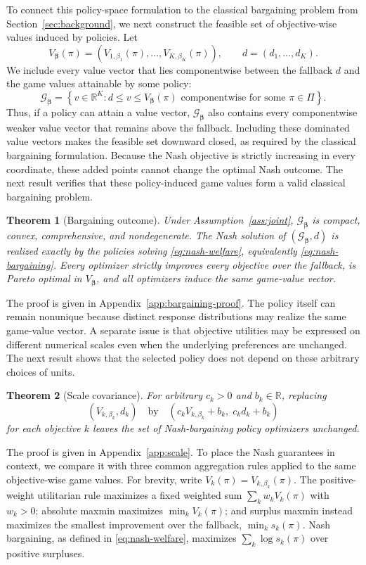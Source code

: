 \documentclass{article}
\newtheorem{theorem}{Theorem}
\theoremstyle{remark}
\theoremstyle{plain}
\newcommand{\G}{\mathcal{G}}
\newcommand{\R}{\mathbb{R}}
\begin{document}
To connect this policy-space formulation to the classical bargaining
problem from Section~\ref{sec:background}, we next construct the feasible
set of objective-wise values induced by policies. Let
\[
V_{\boldsymbol\beta}(\pi)
=
(V_{1,\beta_1}(\pi),\ldots,V_{K,\beta_K}(\pi)),
\qquad
d=(d_1,\ldots,d_K).
\]
We include every value vector that lies componentwise between the
fallback $d$ and the game values attainable by some policy:
\begin{equation}
\G_{\boldsymbol\beta}
=
\left\{
v\in\R^K:
d\le v\le V_{\boldsymbol\beta}(\pi)
\text{ componentwise for some }\pi\in\Pi
\right\}.
\label{eq:comprehensive-hull}
\end{equation}
Thus, if a policy can attain a value vector, $\G_{\boldsymbol\beta}$ also contains every componentwise weaker value vector that remains above the fallback. Including these dominated value vectors makes the feasible set downward closed, as required by the classical bargaining formulation. Because the Nash objective is strictly increasing in every coordinate, these added points cannot change the optimal Nash outcome. The next result verifies that these policy-induced game values form a valid classical bargaining problem.

\begin{theorem}[Bargaining outcome]
\label{thm:bargaining}
Under Assumption~\ref{ass:joint},
$\G_{\boldsymbol\beta}$ is compact, convex, comprehensive, and nondegenerate. The Nash solution of
$(\G_{\boldsymbol\beta},d)$ is realized exactly by the policies solving \eqref{eq:nash-welfare}, equivalently \eqref{eq:nash-bargaining}. Every optimizer strictly improves every objective over the fallback, is Pareto optimal in $V_{\boldsymbol\beta}$, and all optimizers induce the same game-value vector.
\end{theorem}
The proof is given in Appendix~\ref{app:bargaining-proof}.
The policy itself can remain nonunique because distinct response distributions may realize the same game-value vector. A separate issue is that objective utilities may be expressed on different numerical scales even when the underlying preferences are unchanged. The next result shows that the selected policy does not depend on these arbitrary choices of units.

\begin{theorem}[Scale covariance]
\label{thm:scale}
For arbitrary $c_k>0$ and $b_k\in\R$, replacing
\[
(V_{k,\beta_k},d_k)
\quad\text{by}\quad
(c_kV_{k,\beta_k}+b_k,\;c_kd_k+b_k)
\]
for each objective $k$ leaves the set of Nash-bargaining policy
optimizers unchanged.
\end{theorem}
The proof is given in Appendix~\ref{app:scale}.
To place the Nash guarantees in context, we compare it with three common
aggregation rules applied to the same objective-wise game values. For
brevity, write $V_k(\pi)=V_{k,\beta_k}(\pi)$. The positive-weight
utilitarian rule maximizes a fixed weighted sum
$\sum_k w_k V_k(\pi)$ with $w_k>0$; absolute maxmin maximizes
$\min_k V_k(\pi)$; and surplus maxmin instead maximizes the smallest
improvement over the fallback, $\min_k s_k(\pi)$. Nash bargaining, as
defined in \eqref{eq:nash-welfare}, maximizes
$\sum_k\log s_k(\pi)$ over positive surpluses.
\end{document}
